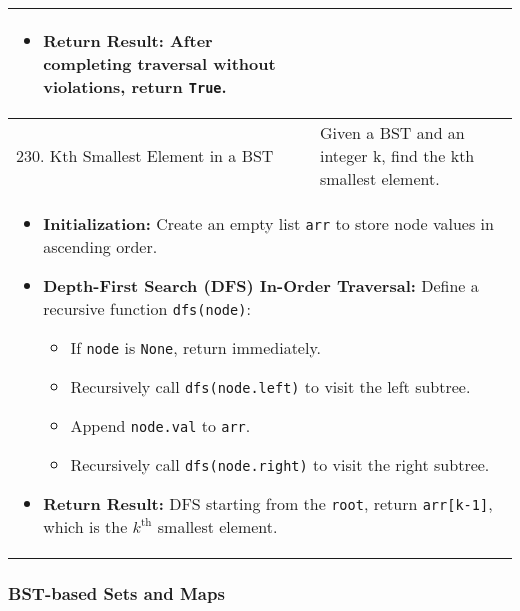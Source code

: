 \begin{summary}
\begin{center}
\begin{tabular}{ll}
{\begin{itemize}
                    \item \textbf{Return Result:} After completing traversal without violations, return \texttt{True}.
                \end{itemize}                              
            } \\
            \midrule
            230. Kth Smallest Element in a BST & Given a BST and an integer k, find the kth smallest element. \\
            \multicolumn{2}{p{\linewidth}}{
                \begin{itemize}
                    \item \textbf{Initialization:} Create an empty list \texttt{arr} to store node values in ascending order.
                
                    \item \textbf{Depth-First Search (DFS) In-Order Traversal:} Define a recursive function \texttt{dfs(node)}:
                        \begin{itemize}
                            \item If \texttt{node} is \texttt{None}, return immediately.
                            \item Recursively call \texttt{dfs(node.left)} to visit the left subtree.
                            \item Append \texttt{node.val} to \texttt{arr}.
                            \item Recursively call \texttt{dfs(node.right)} to visit the right subtree.
                        \end{itemize}
                
                    \item \textbf{Return Result:} DFS starting from the \texttt{root}, return \texttt{arr[k-1]}, which is the $k^{\text{th}}$ smallest element.
                \end{itemize}   
            } \\
            \bottomrule
        \end{tabular}
    \end{center}
\end{summary}
\newpage

\subsubsection{BST-based Sets and Maps}

